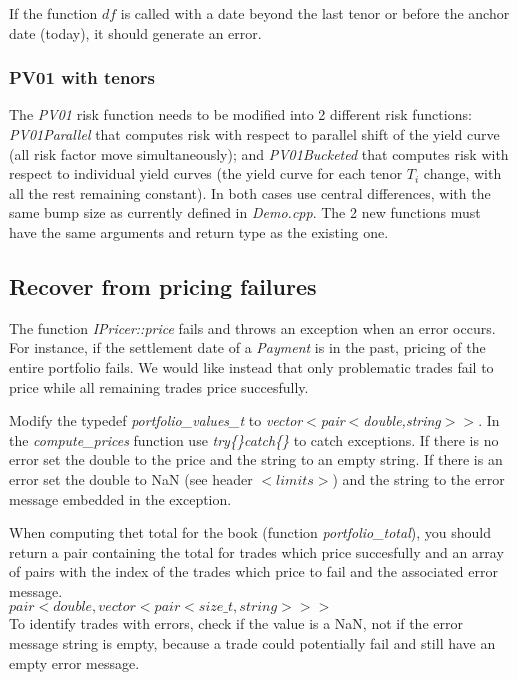 \documentclass[10pt]{article}
\begin{document}
If the function $df$ is called with a date beyond the last tenor or before the anchor date (today), it should generate an error.

\subsubsection{PV01 with tenors}
\label{sec:pv01}
The \textit{PV01} risk function needs to be modified into 2 different risk functions: \textit{PV01Parallel} that computes risk with respect to parallel shift of the yield curve (all risk factor move simultaneously); and \textit{PV01Bucketed} that computes risk with respect to individual yield curves (the yield curve for each tenor $T_i$ change, with all the rest remaining constant). In both cases use central differences, with the same bump size as currently defined in \textit{Demo.cpp}. The 2 new functions must have the same arguments and return type as the existing one.

\subsection{Recover from pricing failures}
The function \textit{IPricer::price} fails and throws an exception when an error occurs. For instance, if the settlement date of a \textit{Payment} is in the past, pricing of the entire portfolio fails. We would like instead that only problematic trades fail to price while all remaining trades price succesfully.

Modify the typedef \textit{portfolio\_values\_t} to \textit{vector$<$pair$<$double,string$>>$}. In the \textit{compute\_prices} function use \textit{try\{\}catch\{\}} to catch exceptions. If there is no error set the double to the price and the string to an empty string. If there is an error set the double to NaN (see header $<limits>$) and the string to the error message embedded in the exception.

When computing thet total for the book (function \textit{portfolio\_total}), you should return a pair containing the total for trades which price succesfully and an array of pairs with the index of the trades which price to fail and the associated error message.\\
$pair<double,vector<pair<size\_t,string>>>$\\
To identify trades with errors, check if the value is a NaN, not if the error message string is empty, because a trade could potentially fail and still have an empty error message.
\end{document}
